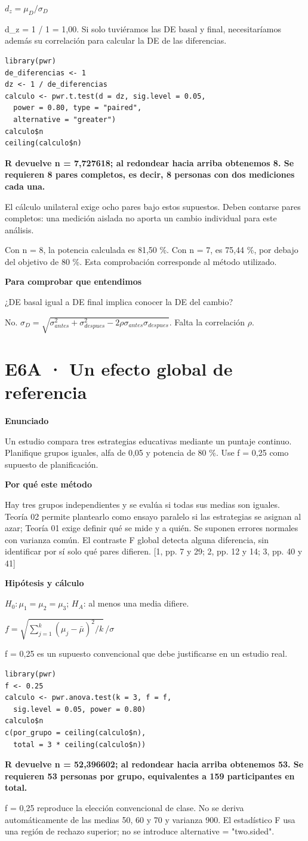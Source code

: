 \documentclass[10pt,a4paper]{article}
\newcommand{\etiqueta}[1]{\par{\bfseries\color{Blue}#1}\par}
\newcommand{\cajares}[1]{\par\colorbox{Pale}{\parbox{\dimexpr\linewidth-2\fboxsep}{\vspace{4pt}\textbf{\color{Navy}#1}\vspace{4pt}}}\par}
\begin{document}
$d_z=\mu_D/\sigma_D$

d\_z = 1 / 1 = 1,00. Si solo tuviéramos las DE basal y final, necesitaríamos además su correlación para calcular la DE de las diferencias.
\begin{Verbatim}
library(pwr)
de_diferencias <- 1
dz <- 1 / de_diferencias
calculo <- pwr.t.test(d = dz, sig.level = 0.05,
  power = 0.80, type = "paired",
  alternative = "greater")
calculo$n
ceiling(calculo$n)
\end{Verbatim}
\cajares{R devuelve n = 7,727618; al redondear hacia arriba obtenemos 8. Se requieren 8 pares completos, es decir, 8 personas con dos mediciones cada una.}
El cálculo unilateral exige ocho pares bajo estos supuestos. Deben contarse pares completos: una medición aislada no aporta un cambio individual para este análisis.

{\small\color{Gray}Con n = 8, la potencia calculada es 81,50 \%. Con n = 7, es 75,44 \%, por debajo del objetivo de 80 \%. Esta comprobación corresponde al método utilizado.}
\etiqueta{Para comprobar que entendimos}
¿DE basal igual a DE final implica conocer la DE del cambio?

{\small No. $\sigma_D=\sqrt{\sigma_{antes}^2+\sigma_{despues}^2-2\rho\sigma_{antes}\sigma_{despues}}$. Falta la correlación $\rho$.}
\clearpage
\section*{E6A · Un efecto global de referencia}
\etiqueta{Enunciado}
Un estudio compara tres estrategias educativas mediante un puntaje continuo. Planifique grupos iguales, alfa de 0,05 y potencia de 80 \%. Use f = 0,25 como supuesto de planificación.
\etiqueta{Por qué este método}
Hay tres grupos independientes y se evalúa si todas sus medias son iguales. Teoría 02 permite plantearlo como ensayo paralelo si las estrategias se asignan al azar; Teoría 01 exige definir qué se mide y a quién. Se suponen errores normales con varianza común. El contraste F global detecta alguna diferencia, sin identificar por sí solo qué pares difieren. [1, pp. 7 y 29; 2, pp. 12 y 14; 3, pp. 40 y 41]
\etiqueta{Hipótesis y cálculo}
$H_0:\mu_1=\mu_2=\mu_3$; $H_A$: al menos una media difiere.

$f=\sqrt{\sum_{j=1}^{k}(\mu_j-\bar\mu)^2/k}\,/\sigma$

f = 0,25 es un supuesto convencional que debe justificarse en un estudio real.
\begin{Verbatim}
library(pwr)
f <- 0.25
calculo <- pwr.anova.test(k = 3, f = f,
  sig.level = 0.05, power = 0.80)
calculo$n
c(por_grupo = ceiling(calculo$n),
  total = 3 * ceiling(calculo$n))
\end{Verbatim}
\cajares{R devuelve n = 52,396602; al redondear hacia arriba obtenemos 53. Se requieren 53 personas por grupo, equivalentes a 159 participantes en total.}
f = 0,25 reproduce la elección convencional de clase. No se deriva automáticamente de las medias 50, 60 y 70 y varianza 900. El estadístico F usa una región de rechazo superior; no se introduce alternative = "two.sided".
\end{document}
